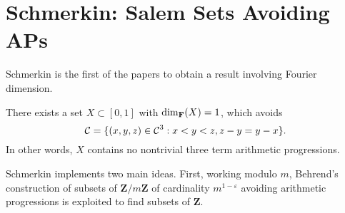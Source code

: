 \section{Schmerkin: Salem Sets Avoiding APs}

Schmerkin is the first of the papers to obtain a result involving Fourier dimension.

\begin{theorem}
    There exists a set $X \subset [0,1]$ with $\operatorname{\dim_{\mathbf{F}}}(X) = 1$, which avoids
    \[ \operatorname{\mathcal{C}} = \{ (x,y,z) \in \operatorname{\mathcal{C}}^3 : x < y < z, z - y = y - x \}. \]
    In other words, $X$ contains no nontrivial three term arithmetic progressions.
\end{theorem}

Schmerkin implements two main ideas. First, working modulo $m$, Behrend's construction of subsets of $\mathbf{Z}/m\mathbf{Z}$ of cardinality $m^{1-\varepsilon}$ avoiding arithmetic progressions is exploited to find subsets of $\mathbf{Z}$.

\endinput